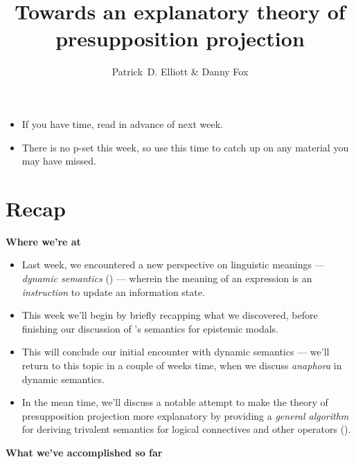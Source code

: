\documentclass[nols,twoside,nofonts,nobib,nohyper]{tufte-handout}
\title{Towards an explanatory theory of presupposition projection}
\author[Patrick D. Elliott \& Danny Fox]{Patrick~D. Elliott \& Danny Fox}
\theoremstyle{definition}
\begin{document}
\maketitle%

\begin{tcolorbox}[title=homework]
  \begin{itemize}
\item If you have time, read \citet{Fox2013} in advance of next week.
\item There is no p-set this week, so use this time to catch up on any material you may have missed.
  \end{itemize}
\end{tcolorbox}

\section{Recap}

\textbf{Where we're at}

\begin{itemize}

\item Last week, we encountered a new perspective on linguistic meanings --- \textit{dynamic semantics} (\citealt{Heim1982,Heim1983,Veltman1996}) --- wherein the meaning of an expression is an \textit{instruction} to update an information state.

\item This week we'll begin by briefly recapping what we discovered, before finishing our discussion of \citeauthor{Veltman1996}'s semantics for epistemic modals.

\item This will conclude our initial encounter with dynamic semantics --- we'll return to this topic in a couple of weeks time, when we discuss \textit{anaphora} in dynamic semantics.

\item In the mean time, we'll discuss a notable attempt to make the theory of presupposition projection more explanatory by providing a \textit{general algorithm} for deriving trivalent semantics for logical connectives and other operators (\citealt{George2008,George2014}).

\end{itemize}

\textbf{What we've accomplished so far}
\end{document}
